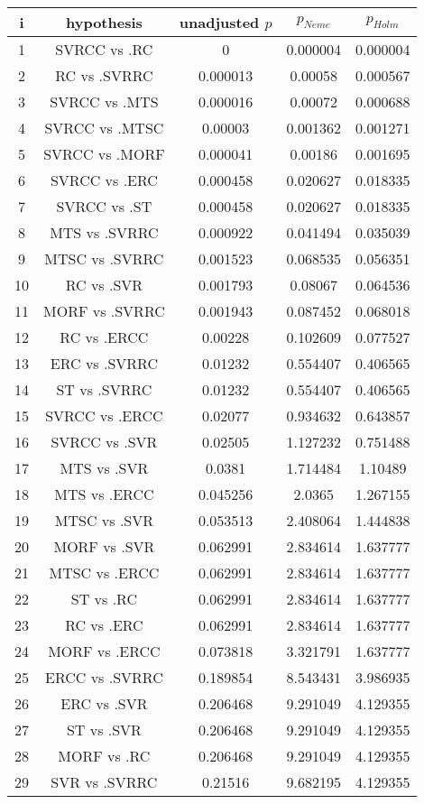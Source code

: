 \documentclass[a4paper,10pt]{article}
\begin{document}
\begin{landscape}
\begin{table}[!htp]
\centering\scriptsize
\begin{tabular}{ccccc}
i&hypothesis&unadjusted $p$&$p_{Neme}$&$p_{Holm}$\\
\hline1&SVRCC vs .RC&0&0.000004&0.000004\\
2&RC vs .SVRRC&0.000013&0.00058&0.000567\\
3&SVRCC vs .MTS&0.000016&0.00072&0.000688\\
4&SVRCC vs .MTSC&0.00003&0.001362&0.001271\\
5&SVRCC vs .MORF&0.000041&0.00186&0.001695\\
6&SVRCC vs .ERC&0.000458&0.020627&0.018335\\
7&SVRCC vs .ST&0.000458&0.020627&0.018335\\
8&MTS vs .SVRRC&0.000922&0.041494&0.035039\\
9&MTSC vs .SVRRC&0.001523&0.068535&0.056351\\
10&RC vs .SVR&0.001793&0.08067&0.064536\\
11&MORF vs .SVRRC&0.001943&0.087452&0.068018\\
12&RC vs .ERCC&0.00228&0.102609&0.077527\\
13&ERC vs .SVRRC&0.01232&0.554407&0.406565\\
14&ST vs .SVRRC&0.01232&0.554407&0.406565\\
15&SVRCC vs .ERCC&0.02077&0.934632&0.643857\\
16&SVRCC vs .SVR&0.02505&1.127232&0.751488\\
17&MTS vs .SVR&0.0381&1.714484&1.10489\\
18&MTS vs .ERCC&0.045256&2.0365&1.267155\\
19&MTSC vs .SVR&0.053513&2.408064&1.444838\\
20&MORF vs .SVR&0.062991&2.834614&1.637777\\
21&MTSC vs .ERCC&0.062991&2.834614&1.637777\\
22&ST vs .RC&0.062991&2.834614&1.637777\\
23&RC vs .ERC&0.062991&2.834614&1.637777\\
24&MORF vs .ERCC&0.073818&3.321791&1.637777\\
25&ERCC vs .SVRRC&0.189854&8.543431&3.986935\\
26&ERC vs .SVR&0.206468&9.291049&4.129355\\
27&ST vs .SVR&0.206468&9.291049&4.129355\\
28&MORF vs .RC&0.206468&9.291049&4.129355\\
29&SVR vs .SVRRC&0.21516&9.682195&4.129355\\

\end{tabular}
\end{table}
\end{landscape}
\end{document}
